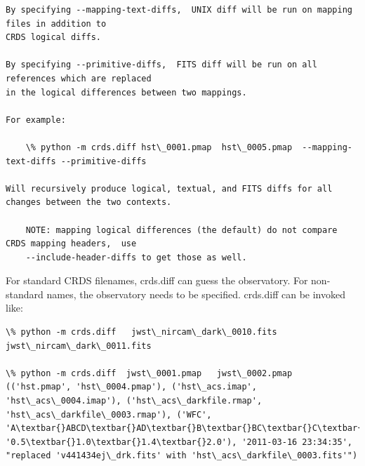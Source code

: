 \documentclass[letterpaper,10pt,english]{sphinxmanual}
\begin{document}
\begin{Verbatim}[commandchars=\\\{\}]
By specifying --mapping-text-diffs,  UNIX diff will be run on mapping files in addition to
CRDS logical diffs.

By specifying --primitive-diffs,  FITS diff will be run on all references which are replaced
in the logical differences between two mappings.

For example:

    \% python -m crds.diff hst\_0001.pmap  hst\_0005.pmap  --mapping-text-diffs --primitive-diffs

Will recursively produce logical, textual, and FITS diffs for all changes between the two contexts.

    NOTE: mapping logical differences (the default) do not compare CRDS mapping headers,  use
    --include-header-diffs to get those as well.
\end{Verbatim}

For standard CRDS filenames,  crds.diff can guess the observatory.   For
non-standard names,  the observatory needs to be specified.  crds.diff can be
invoked like:

\begin{Verbatim}[commandchars=\\\{\}]
\% python -m crds.diff   jwst\_nircam\_dark\_0010.fits  jwst\_nircam\_dark\_0011.fits

\% python -m crds.diff  jwst\_0001.pmap   jwst\_0002.pmap
(('hst.pmap', 'hst\_0004.pmap'), ('hst\_acs.imap', 'hst\_acs\_0004.imap'), ('hst\_acs\_darkfile.rmap', 'hst\_acs\_darkfile\_0003.rmap'), ('WFC', 'A\textbar{}ABCD\textbar{}AD\textbar{}B\textbar{}BC\textbar{}C\textbar{}D', '0.5\textbar{}1.0\textbar{}1.4\textbar{}2.0'), '2011-03-16 23:34:35', "replaced 'v441434ej\_drk.fits' with 'hst\_acs\_darkfile\_0003.fits'")
\end{Verbatim}
\end{document}
